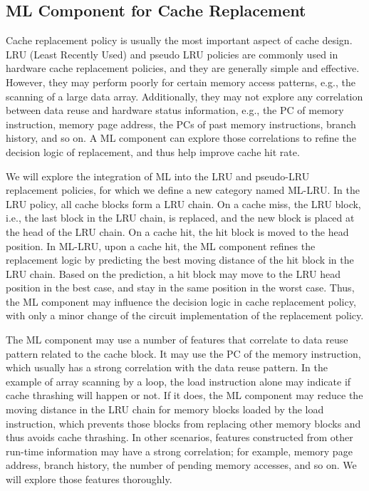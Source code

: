 \subsection{ML Component for Cache Replacement}

Cache replacement policy is usually the most important aspect of cache design.
LRU (Least Recently Used) and pseudo LRU policies are commonly used in hardware
cache replacement policies, and they are generally simple and effective.
However, they may perform poorly for certain memory access patterns, e.g., the
scanning of a large data array.  Additionally, they may not explore any
correlation between data reuse and hardware status information, e.g., the PC of
memory instruction, memory page address, the PCs of past memory instructions,
branch history, and so on.  A ML component can explore those correlations to
refine the decision logic of replacement, and thus help improve cache hit rate.

We will explore the integration of ML into the LRU and pseudo-LRU replacement
policies, for which we define a new category named ML-LRU.  In the LRU policy,
all cache blocks form a LRU chain.  On a cache miss, the LRU block, i.e., the
last block in the LRU chain, is replaced, and the new block is placed at the
head of the LRU chain.  On a cache hit, the hit block is moved to the head
position. In ML-LRU, upon a cache hit, the ML component refines the replacement
logic by predicting the best moving distance of the hit block in the LRU chain.
Based on the prediction, a hit block may move to the LRU head position in the
best case, and stay in the same position in the worst case.  Thus, the ML
component may influence the decision logic in cache replacement policy, with
only a minor change of the circuit implementation of the replacement policy.

The ML component may use a number of features that correlate to data reuse
pattern related to the cache block.  It may use the PC of the memory
instruction, which usually has a strong correlation with the data reuse pattern.
In the example of array scanning by a loop, the load instruction alone may
indicate if cache thrashing will happen or not.  If it does, the ML component
may reduce the moving distance in the LRU chain for memory blocks loaded by the
load instruction, which prevents those blocks from replacing other memory blocks
and thus avoids cache thrashing.  In other scenarios, features constructed from
other run-time information may have a strong correlation; for example, memory
page address, branch history, the number of pending memory accesses, and so on.
We will explore those features thoroughly.

